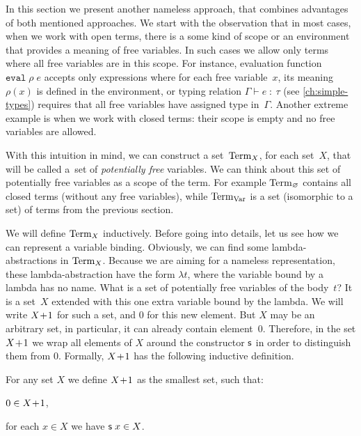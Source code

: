 In this section we present another nameless approach,
that combines advantages of both mentioned approaches.
We start with the observation that in most cases, when we work
with open terms, there is a some kind of scope or an environment
that provides a meaning of free variables.
In such cases we allow only terms where all free variables
are in this scope.
For instance, evaluation function $\texttt{eval}\;\rho\;e$
accepts only expressions where for each free variable~$x$,
its meaning $\rho(x)$ is defined in the environment,
or typing relation $\Gamma\vdash e\;:\:\tau$
(see \autoref{ch:simple-types})
requires that all free variables have assigned type in~$\Gamma$.
Another extreme example is when we work with closed terms:
their scope is empty and no free variables are allowed.

With this intuition in mind, we can construct a set~$\mathrm{Term}_{X}$,
for each set~$X$, that will be called a~set of
\emph{potentially free} variables.
We can think about this set of potentially free variables
as a scope of the term.
For example $\mathrm{Term}_{\varnothing}$ contains all closed terms
(without any free variables),
while $\mathrm{Term}_{\mathrm{Var}}$ is a set (isomorphic to a set)
of terms from the previous section.

We will define $\mathrm{Term}_{X}$ inductively.
Before going into details, let us see how we can represent a variable binding.
Obviously, we can find some lambda-abstractions in $\mathrm{Term}_{X}$.
Because we are aiming for a nameless representation,
these lambda-abstraction have the form $\lambda t$,
where the variable bound by a lambda has no name.
What is a set of potentially free variables of the body~$t$?
It is a set~$X$ extended with this one extra variable bound by the lambda.
We will write $X\!+\!1$ for such a set,
and $0$ for this new element.
But $X$ may be an arbitrary set, in particular, it can already contain element~$0$.
Therefore, in the set $X\!+\!1$
we wrap all elements of $X$ around the constructor $\mathsf{s}$
in order to distinguish them from $0$.
Formally, $X\!+\!1$ has the following inductive definition.

\begin{defin}
  For any set $X$ we define $X\!+\!1$ as the smallest set, such that:
  \begin{thmenumerate}
  \item $0 \in X\!+\!1$,
  \item for each $x\in X$ we have $\mathsf{s}\;x \in X$.
  \end{thmenumerate}
\end{defin}


